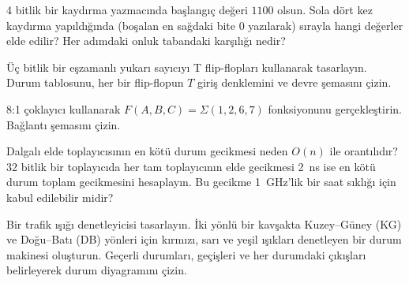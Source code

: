 \begin{alistirma}[\orta]
4 bitlik bir kaydırma yazmacında başlangıç değeri $1100$ olsun. Sola dört kez kaydırma yapıldığında (boşalan en sağdaki bite 0 yazılarak) sırayla hangi değerler elde edilir? Her adımdaki onluk tabandaki karşılığı nedir?
\end{alistirma}

\begin{alistirma}[\zor]
Üç bitlik bir eşzamanlı yukarı sayıcıyı T flip-flopları kullanarak tasarlayın. Durum tablosunu, her bir flip-flopun $T$ giriş denklemini ve devre şemasını çizin.
\end{alistirma}

\begin{alistirma}[\zor]
8:1 çoklayıcı kullanarak $F(A, B, C) = \Sigma(1, 2, 6, 7)$ fonksiyonunu gerçekleştirin. Bağlantı şemasını çizin.
\end{alistirma}

\begin{alistirma}[\zor]
Dalgalı elde toplayıcısının en kötü durum gecikmesi neden $O(n)$ ile orantılıdır? 32 bitlik bir toplayıcıda her tam toplayıcının elde gecikmesi 2~ns ise en kötü durum toplam gecikmesini hesaplayın. Bu gecikme 1~GHz'lik bir saat sıklığı için kabul edilebilir midir?
\end{alistirma}

\begin{alistirma}[\zor]
Bir trafik ışığı denetleyicisi tasarlayın. İki yönlü bir kavşakta Kuzey--Güney (KG) ve Doğu--Batı (DB) yönleri için kırmızı, sarı ve yeşil ışıkları denetleyen bir durum makinesi oluşturun. Geçerli durumları, geçişleri ve her durumdaki çıkışları belirleyerek durum diyagramını çizin.
\end{alistirma}
